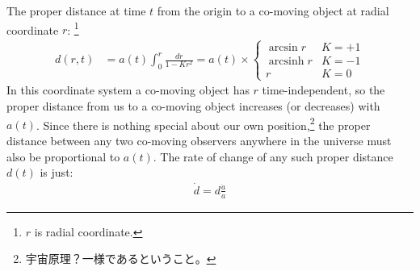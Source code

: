 \documentclass[11pt]{ltjsarticle}
\theoremstyle{plain}
\theoremstyle{break}
\DeclareMathOperator{\arcsinh}{arcsinh}
\begin{document}
The proper distance at time $t$ from the origin to a co-moving object at radial coordinate $r$:
\footnote{$r$ is radial coordinate.}
\begin{align}
  d(r,t)
  &= a(t) \int_0^r \frac{dr}{1-Kr^2}
    =a(t)\times
  		\begin{cases}
                  \arcsin r  & K=+1\\
                  \arcsinh r & K=-1\\
                  r              & K=0
               \end{cases}
\end{align}
In this coordinate system a co-moving object has $r$ time-independent, so the proper distance from us to a co-moving object increases (or decreases) with $a(t)$.
Since there is nothing special about our own position,\footnote{宇宙原理？一様であるということ。} the proper distance between any two co-moving observers anywhere in the universe must also be proportional to $a(t)$.
The rate of change of any such proper distance $d(t)$ is just:
\begin{align}
  \dot{d} = d\frac{\dot{a}}{a}
\end{align}
\end{document}
